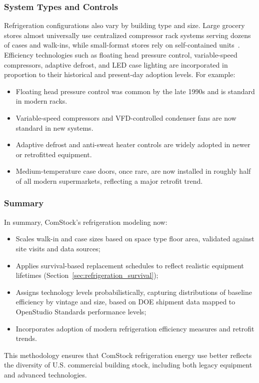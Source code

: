 \subsubsection{System Types and Controls}
Refrigeration configurations also vary by building type and size. Large grocery stores almost universally use centralized compressor rack systems serving dozens of cases and walk-ins, while small-format stores rely on self-contained units~\citep{EIA_FoodSales2018}. Efficiency technologies such as floating head pressure control, variable-speed compressors, adaptive defrost, and LED case lighting are incorporated in proportion to their historical and present-day adoption levels. For example:
\begin{itemize}
    \item Floating head pressure control was common by the late 1990s and is standard in modern racks.
    \item Variable-speed compressors and VFD-controlled condenser fans are now standard in new systems.
    \item Adaptive defrost and anti-sweat heater controls are widely adopted in newer or retrofitted equipment.
    \item Medium-temperature case doors, once rare, are now installed in roughly half of all modern supermarkets, reflecting a major retrofit trend.
\end{itemize}

\subsubsection{Summary}
In summary, ComStock’s refrigeration modeling now:
\begin{itemize}
    \item Scales walk-in and case sizes based on space type floor area, validated against site visits and data sources;
    \item Applies survival-based replacement schedules to reflect realistic equipment lifetimes (Section~\ref{sec:refrigeration_survival});
    \item Assigns technology levels probabilistically, capturing distributions of baseline efficiency by vintage and size, based on DOE shipment data mapped to OpenStudio Standards performance levels;
    \item Incorporates adoption of modern refrigeration efficiency measures and retrofit trends.
\end{itemize}

This methodology ensures that ComStock refrigeration energy use better reflects the diversity of U.S. commercial building stock, including both legacy equipment and advanced technologies.

